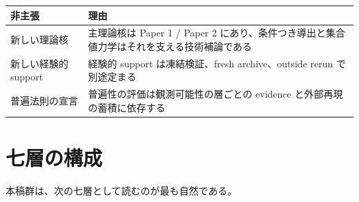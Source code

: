 \documentclass[12pt,a4paper]{article}
\begin{document}
{\def\LTcaptype{table} %
\begin{longtable}[]{@{}
  >{\raggedright\arraybackslash}p{}
  >{\raggedright\arraybackslash}p{}@{}}
\toprule\noalign{}
\begin{minipage}[b]{\linewidth}\raggedright
非主張
\end{minipage} & \begin{minipage}[b]{\linewidth}\raggedright
理由
\end{minipage} \\
\midrule\noalign{}
\endhead
\bottomrule\noalign{}
\endlastfoot
新しい理論核 & 主理論核は Paper 1 / Paper 2 にあり、条件つき導出と集合値力学はそれを支える技術補論である \\
新しい経験的 support & 経験的 support は凍結検証、fresh archive、outside rerun で別途定まる \\
普遍法則の宣言 & 普遍性の評価は観測可能性の層ごとの evidence と外部再現の蓄積に依存する \\
\end{longtable}
}

\section{七層の構成}\label{ux4e03ux5c64ux306eux69cbux6210}

本稿群は、次の七層として読むのが最も自然である。
\end{document}
